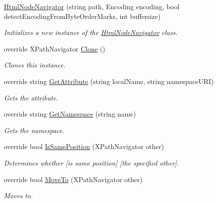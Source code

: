 \begin{DoxyCompactItemize}
\hyperlink{class_html_agility_pack_1_1_html_node_navigator_adece1b769414ac23cfdc5e3055df53ce}{Html\+Node\+Navigator} (string path, Encoding encoding, bool detect\+Encoding\+From\+Byte\+Order\+Marks, int buffersize)
\begin{DoxyCompactList}\small\item\em Initializes a new instance of the \hyperlink{class_html_agility_pack_1_1_html_node_navigator}{Html\+Node\+Navigator} class. \end{DoxyCompactList}\item 
override X\+Path\+Navigator \hyperlink{class_html_agility_pack_1_1_html_node_navigator_af3ce86e553376b49e5756788e2c75257}{Clone} ()
\begin{DoxyCompactList}\small\item\em Clones this instance. \end{DoxyCompactList}\item 
override string \hyperlink{class_html_agility_pack_1_1_html_node_navigator_acce3f25620b1d302a215fc14102606a4}{Get\+Attribute} (string local\+Name, string namespace\+U\+RI)
\begin{DoxyCompactList}\small\item\em Gets the attribute. \end{DoxyCompactList}\item 
override string \hyperlink{class_html_agility_pack_1_1_html_node_navigator_a2e194b0010b262a2de87f09c9fa78a80}{Get\+Namespace} (string name)
\begin{DoxyCompactList}\small\item\em Gets the namespace. \end{DoxyCompactList}\item 
override bool \hyperlink{class_html_agility_pack_1_1_html_node_navigator_af9f7339da8b725e833ef10c9a5668839}{Is\+Same\+Position} (X\+Path\+Navigator other)
\begin{DoxyCompactList}\small\item\em Determines whether \mbox{[}is same position\mbox{]} \mbox{[}the specified other\mbox{]}. \end{DoxyCompactList}\item 
override bool \hyperlink{class_html_agility_pack_1_1_html_node_navigator_ac390a43d465998e92f487003df471541}{Move\+To} (X\+Path\+Navigator other)
\begin{DoxyCompactList}\small\item\em Moves to. \end{DoxyCompactList}\item 

\end{DoxyCompactItemize}

